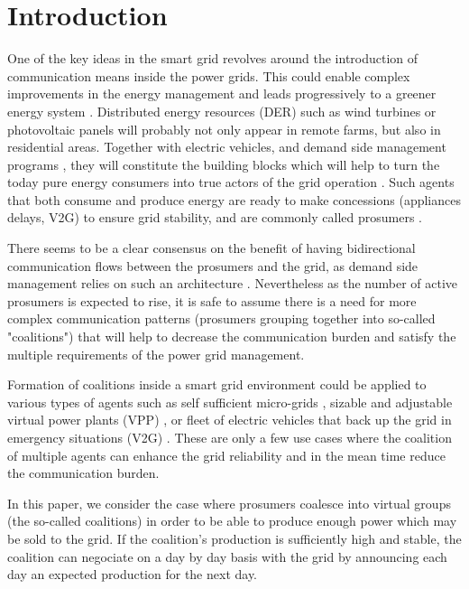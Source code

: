 \documentclass[conference]{IEEEtran}
\begin{document}
\section{Introduction}
\label{sec:introduction}

One of the key ideas in the smart grid revolves around the introduction of communication means inside the power grids. This could enable complex improvements in the energy management and leads progressively to a greener energy system \cite{Ramchurn} \cite{WuHamedHuangBook2011}. Distributed energy resources (DER) such as wind turbines or photovoltaic panels will probably not only appear in remote farms, but also in residential areas. Together with electric vehicles, and demand side management programs \cite{Samadi2014}, they will constitute the building blocks which will help to turn the today pure energy consumers into true actors of the grid operation \cite{Ramchurn}. Such agents that both consume and produce energy are ready to make concessions (appliances delays, V2G) to ensure grid stability, and are commonly called prosumers \cite{6883384,Ramchurn}.

There seems to be a clear consensus on the benefit of having bidirectional communication flows between the prosumers and the grid, as demand side management relies on such an architecture \cite{WuHamedHuangBook2011}. Nevertheless as the number of active prosumers is expected to rise, it is safe to assume there is a need for more complex communication patterns (prosumers grouping together into so-called "coalitions") that will help to decrease the communication burden and satisfy the multiple requirements of the power grid management. 

Formation of coalitions inside a smart grid environment could be applied to various types of agents such as self sufficient micro-grids \cite{Pahwa}, sizable and adjustable virtual power plants (VPP) \cite{Braun, Ramchurn}, or fleet of electric vehicles that back up the grid in emergency situations (V2G) \cite{Ramchurn}. These are only a few use cases where the coalition of multiple agents can enhance the grid reliability and in the mean time reduce the communication burden.

In this paper, we consider the case where prosumers coalesce into virtual groups (the so-called coalitions) in order to be able to produce enough power which may be sold to the grid. If the coalition's production is sufficiently high and stable, the coalition can negociate on a day by day basis with the grid by announcing each day an expected production for the next day. 
\end{document}
